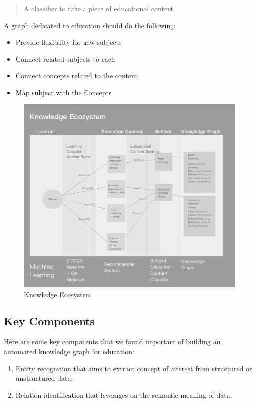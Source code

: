 \documentclass[]{book}
\theoremstyle{definition}
\theoremstyle{definition}
\theoremstyle{definition}
\theoremstyle{remark}
\begin{document}
\begin{quote}
A classifier to take a piece of educational content
\end{quote}

A graph dedicated to education should do the following:

\begin{itemize}
\item
  Provide flexibility for new subjects
\item
  Connect related subjects to each
\item
  Connect concepts related to the content
\item
  Map subject with the Concepts
\end{itemize}

\begin{figure}
\centering
\includegraphics{img/knowledgeEcosystem.png}
\caption{Knowledge Ecosystem}
\end{figure}

\subsection{Key Components}\label{key-components}

Here are some key components that we found important of building an
automated knowledge graph for education:

\begin{enumerate}
\def\labelenumi{\arabic{enumi}.}
\item
  Entity recognition that aims to extract concept of interest from
  structured or unstructured data.
\item
  Relation identification that leverages on the semantic meaning of
  data.
\end{enumerate}
\end{document}
